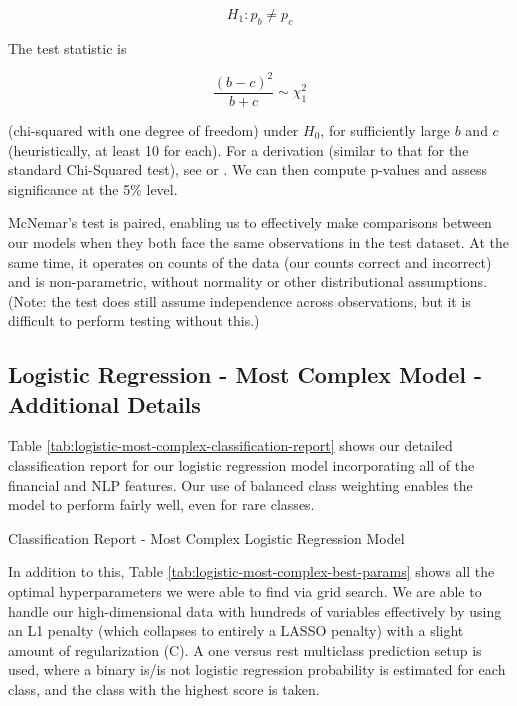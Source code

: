 \documentclass{article}[11pt]
\begin{document}
    \[
    H_{1}:p_{b}\neq p_{c}
    \]

    The test statistic is

    \[
    \frac{(b-c)^{2}}{b+c}\sim\chi_{1}^{2}
    \]

    (chi-squared with one degree of freedom) under $H_{0}$, for sufficiently large $b$ and $c$ (heuristically, at least 10 for each). For a derivation (similar to that for the standard Chi-Squared test), see \cite{mcnemar_note_1947} or \cite{rice_mathematical_2006}. We can then compute p-values and assess significance at the 5\% level.

    McNemar's test is paired, enabling us to effectively make comparisons between our models when they both face the same observations in the test dataset. At the same time, it operates on counts of the data (our counts correct and incorrect) and is non-parametric, without normality or other distributional assumptions. (Note: the test does still assume independence across observations, but it is difficult to perform testing without this.)

    \clearpage
    \newpage
    \subsection{Logistic Regression - Most Complex Model - Additional Details}

    \label{sec:logistic-most-complex-model-additional-details}

    Table \ref{tab:logistic-most-complex-classification-report} shows our detailed classification report for our logistic regression model incorporating all of the financial and NLP features. Our use of balanced class weighting enables the model to perform fairly well, even for rare classes.

    \begin{table}[h!]
        \centering
        \caption{Classification Report - Most Complex Logistic Regression Model}
        
        \label{tab:logistic-most-complex-classification-report}
    \end{table}

    In addition to this, Table \ref{tab:logistic-most-complex-best-params} shows all the optimal hyperparameters we were able to find via grid search. We are able to handle our high-dimensional data with hundreds of variables effectively by using an L1 penalty (which collapses to entirely a LASSO penalty) with a slight amount of regularization (C). A one versus rest multiclass prediction setup is used, where a binary is/is not logistic regression probability is estimated for each class, and the class with the highest score is taken.
\end{document}
